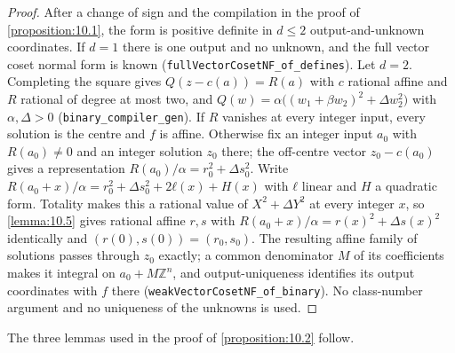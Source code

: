 \begin{proof}
After a change of sign and the compilation in the proof of \cref{proposition:10.1}, the form is positive definite in $d ≤ 2$ output-and-unknown coordinates. If $d = 1$ there is one output and no unknown, and the full vector coset normal form is known (\texttt{fullVectorCosetNF\_of\_defines}). Let $d = 2$. Completing the square gives $Q(z - c(a)) = R(a)$ with $c$ rational affine and $R$ rational of degree at most two, and $Q(w) = α\big((w_{1} + βw_{2})^{2} + Δw_{2}^{2}\big)$ with $α, Δ > 0$ (\texttt{binary\_compiler\_gen}). If $R$ vanishes at every integer input, every solution is the centre and $f$ is affine. Otherwise fix an integer input $a_{0}$ with $R(a_{0}) ≠ 0$ and an integer solution $z_{0}$ there; the off-centre vector $z_{0} - c(a_{0})$ gives a representation $R(a_{0})/α = r_{0}^{2} + Δ s_{0}^{2}$. Write $R(a_{0} + x)/α = r_{0}^{2} + Δs_{0}^{2} + 2ℓ(x) + H(x)$ with $ℓ$ linear and $H$ a quadratic form. Totality makes this a rational value of $X^{2} + ΔY^{2}$ at every integer $x$, so \cref{lemma:10.5} gives rational affine $r, s$ with $R(a_{0} + x)/α = r(x)^{2} + Δ s(x)^{2}$ identically and $(r(0), s(0)) = (r_{0}, s_{0})$. The resulting affine family of solutions passes through $z_{0}$ exactly; a common denominator $M$ of its coefficients makes it integral on $a_{0} + Mℤ^{n}$, and output-uniqueness identifies its output coordinates with $f$ there (\texttt{weakVectorCosetNF\_of\_binary}). No class-number argument and no uniqueness of the unknowns is used.
\end{proof}

The three lemmas used in the proof of \cref{proposition:10.2} follow.


